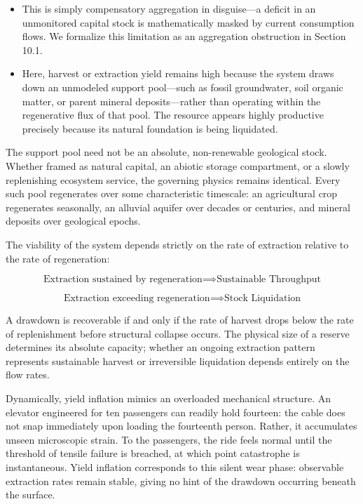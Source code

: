 \documentclass[11pt]{article}
\begin{document}
\begin{itemize}\setlength{\itemsep}{2pt}
\item This is simply compensatory aggregation in disguise---a deficit in an unmonitored capital stock is mathematically masked by current consumption flows. We formalize this limitation as an aggregation obstruction in Section 10.1.
\item Here, harvest or extraction yield remains high because the system draws down an unmodeled support pool---such as fossil groundwater, soil organic matter, or parent mineral deposits---rather than operating within the regenerative flux of that pool. The resource appears highly productive precisely because its natural foundation is being liquidated.
\end{itemize}

The support pool need not be an absolute, non-renewable geological stock. Whether framed as natural capital, an abiotic storage compartment, or a slowly replenishing ecosystem service, the governing physics remains identical. Every such pool regenerates over some characteristic timescale: an agricultural crop regenerates seasonally, an alluvial aquifer over decades or centuries, and mineral deposits over geological epochs.

The viability of the system depends strictly on the rate of extraction relative to the rate of regeneration:

\[ \text{Extraction sustained by regeneration} \implies \text{Sustainable Throughput} \]

\[ \text{Extraction exceeding regeneration} \implies \text{Stock Liquidation} \]

A drawdown is recoverable if and only if the rate of harvest drops below the rate of replenishment before structural collapse occurs. The physical size of a reserve determines its absolute capacity; whether an ongoing extraction pattern represents sustainable harvest or irreversible liquidation depends entirely on the flow rates.

Dynamically, yield inflation mimics an overloaded mechanical structure. An elevator engineered for ten passengers can readily hold fourteen: the cable does not snap immediately upon loading the fourteenth person. Rather, it accumulates unseen microscopic strain. To the passengers, the ride feels normal until the threshold of tensile failure is breached, at which point catastrophe is instantaneous. Yield inflation corresponds to this silent wear phase: observable extraction rates remain stable, giving no hint of the drawdown occurring beneath the surface.
\end{document}
